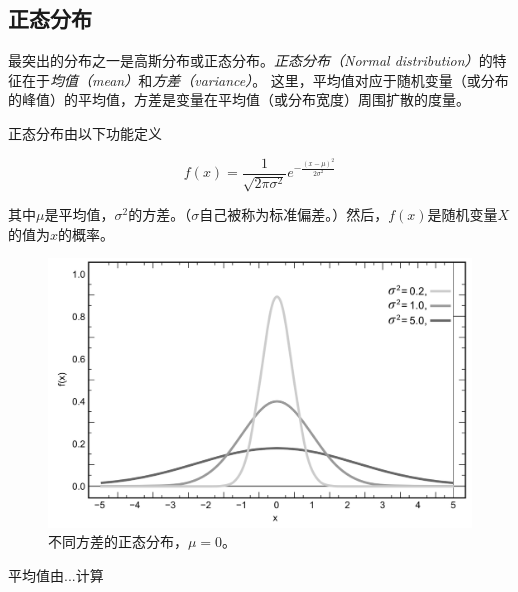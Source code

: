 
\subsection{正态分布}
最突出的分布之一是高斯分布或正态分布。\emph{正态分布（Normal distribution）}的特征在于\emph{均值（mean）}和\emph{方差（variance）}。 这里，平均值对应于随机变量（或分布的峰值）的平均值，方差是变量在平均值（或分布宽度）周围扩散的度量。

正态分布由以下功能定义

\begin{equation}
f(x)=\frac{1}{\sqrt{2\pi\sigma^2}}e^{-\frac{(x-\mu)^2}{2\sigma^2}}
\end{equation}


其中$\mu$是平均值，$\sigma^2$的方差。（$\sigma$自己被称为标准偏差。）然后，$f(x)$是随机变量$X$的值为$x$的概率。

\begin{figure}
	\centering
		\includegraphics[width=\textwidth]{figs/Normal_Distribution_PDF}
	\caption{不同方差的正态分布，$\mu=0$。}
	\label{fig:Normal_Distribution_PDF}
\end{figure}


平均值由...计算

